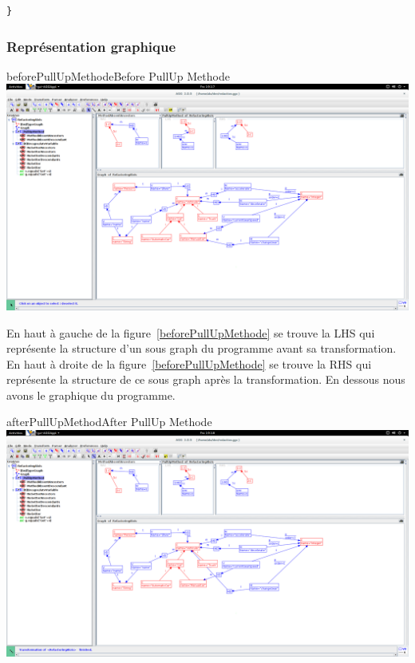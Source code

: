 \documentclass[a4paper, 12pt]{article}
\begin{document}
\begin{enumerate}
\begin{lstlisting}[frame=single]
}
\end{lstlisting}

\subsubsection{Représentation graphique}

\begin{myfig}{beforePullUpMethode}{Before PullUp Methode}
\includegraphics[width=\textwidth]{beforePullUpMethode.png}
\end{myfig}

En haut à gauche de la figure~\ref{beforePullUpMethode} se trouve la LHS qui représente la structure d'un sous graph du programme avant sa transformation. 
En haut à droite de la figure~\ref{beforePullUpMethode} se trouve la RHS qui représente la structure de ce sous graph après la transformation.
En dessous nous avons le graphique du programme.

\begin{myfig}{afterPullUpMethod}{After PullUp Methode}
\includegraphics[width=\textwidth]{afterPullUpMethod.png}
\end{myfig}


\end{enumerate}
\end{document}

